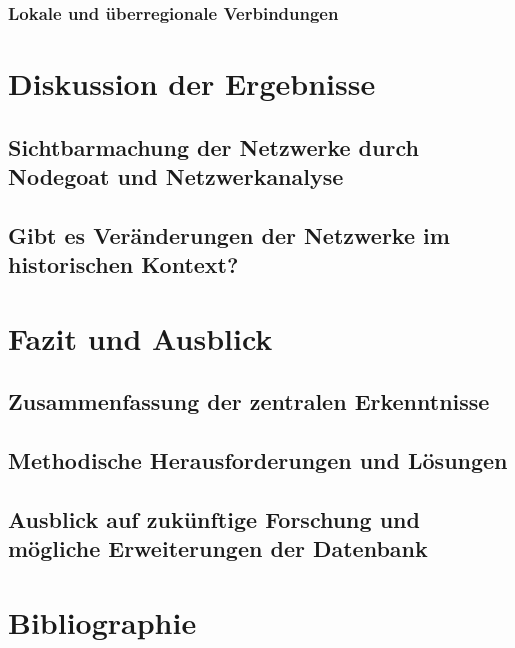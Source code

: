 \documentclass[12pt, a4paper, ngerman, bidi=default]{article}
\begin{document}
  \subsubsection{ Lokale und überregionale Verbindungen}
  \newpage
\section{Diskussion der Ergebnisse}
  \subsection{Sichtbarmachung der Netzwerke durch Nodegoat und Netzwerkanalyse}
  \subsection{Gibt es Veränderungen der Netzwerke im historischen Kontext?}
  \newpage
\section{Fazit und Ausblick}
\subsection{Zusammenfassung der zentralen Erkenntnisse}
\subsection{Methodische Herausforderungen und Lösungen}
\subsection{Ausblick auf zukünftige Forschung und mögliche Erweiterungen der Datenbank}
\newpage
\section{Bibliographie}
\printbibliography[
heading=bibintoc,
title={References} %
]
\end{document}
